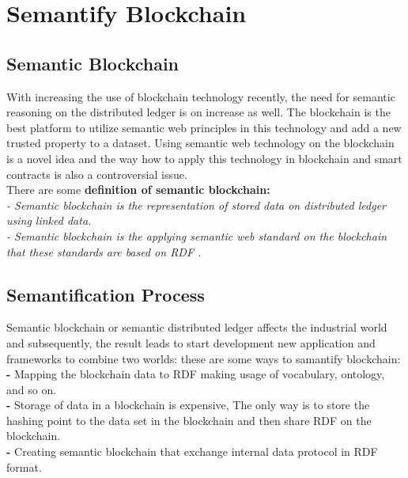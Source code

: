 \section{Semantify Blockchain}
\subsection{Semantic Blockchain}
With increasing the use of blockchain technology recently, the need for semantic reasoning on the distributed ledger is on increase as well. The blockchain is the best platform to utilize semantic web principles in this technology and add a new trusted property to a dataset. 
Using semantic web technology on the blockchain is a novel idea and the way how to apply this technology in blockchain and smart contracts is also a controversial issue.\\
There are some \textbf{definition of semantic blockchain:}\\ 
\textit{- Semantic blockchain is the representation of stored data on distributed ledger using linked data. }\\
\textit{- Semantic blockchain is the applying semantic web standard on the blockchain that these standards are based on RDF \cite{Hector}.}

\subsection{Semantification Process}
Semantic blockchain or semantic distributed ledger affects the industrial world and subsequently, the result leads to start development new application and frameworks to combine two worlds:
these are some ways to samantify blockchain:\\
\textbf{-} Mapping the blockchain data to RDF making usage of vocabulary, ontology, and so on.\\
\textbf{-} Storage of data in a blockchain is expensive, The only way is to store the hashing point to the data set in the blockchain and then share RDF on the blockchain. \\
\textbf{-} Creating semantic blockchain that exchange internal data protocol in RDF format\cite{Hector}. \\

